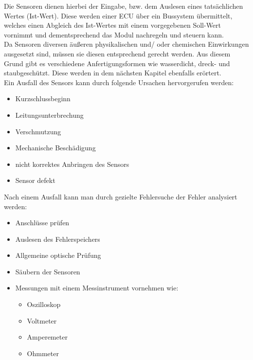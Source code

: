 \begin{flushleft}
	    Die Sensoren dienen hierbei der Eingabe,  bzw. dem Auslesen eines tatsächlichen Wertes (Ist-Wert). Diese werden einer ECU über ein Bussystem übermittelt, welches einen Abgleich des Ist-Wertes mit einem vorgegebenen Soll-Wert vornimmt und dementsprechend das Modul nachregeln und steuern kann. \\ 
	    
	    Da Sensoren diversen äußeren physikalischen und/ oder chemischen Einwirkungen ausgesetzt sind, müssen sie diesen entsprechend gerecht werden. Aus diesem Grund gibt es verschiedene Anfertigungsformen wie wasserdicht, dreck- und staubgeschützt. Diese werden in dem nächsten Kapitel ebenfalls erörtert.\\  
	            
	    Ein Ausfall des Sensors kann durch folgende Ursachen hervorgerufen werden:
	
	        \begin{itemize}
	            \item Kurzschlussbeginn
	            \item Leitungsunterbrechung
	            \item Verschmutzung
	            \item Mechanische Beschädigung
	            \item nicht korrektes Anbringen des Sensors
	            \item Sensor defekt
	        \end{itemize}	
	        
	        Nach einem Ausfall kann man durch gezielte Fehlersuche der Fehler analysiert werden:
	
	        \begin{itemize}
	            \item Anschlüsse prüfen
	            \item Auslesen des Fehlerspeichers
	            \item Allgemeine optische Prüfung
	            \item Säubern der Sensoren
	            \item Messungen mit einem Messinstrument vornehmen wie:
	            \begin{itemize}
	                \item Oszilloskop 
	                \item Voltmeter
	                \item Amperemeter
	                \item Ohmmeter	
	            \end{itemize}
	            

\end{itemize}
\end{flushleft}

